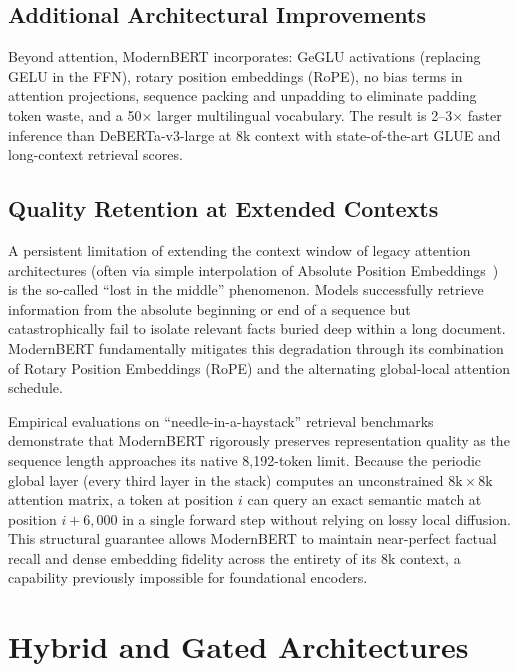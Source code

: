 \documentclass[11pt]{article}
\begin{document}
\subsection{Additional Architectural Improvements}

Beyond attention, ModernBERT incorporates: GeGLU activations (replacing GELU in the FFN), rotary position embeddings (RoPE), no bias terms in attention projections, sequence packing and unpadding to eliminate padding token waste, and a 50$\times$ larger multilingual vocabulary. The result is 2–3$\times$ faster inference than DeBERTa-v3-large at 8k context with state-of-the-art GLUE and long-context retrieval scores.

\subsection{Quality Retention at Extended Contexts}

A persistent limitation of extending the context window of legacy attention architectures (often via simple interpolation of Absolute Position Embeddings~\cite{devlin2018bert}) is the so-called ``lost in the middle'' phenomenon. Models successfully retrieve information from the absolute beginning or end of a sequence but catastrophically fail to isolate relevant facts buried deep within a long document. ModernBERT fundamentally mitigates this degradation through its combination of Rotary Position Embeddings (RoPE) and the alternating global-local attention schedule.

Empirical evaluations on ``needle-in-a-haystack'' retrieval benchmarks demonstrate that ModernBERT rigorously preserves representation quality as the sequence length approaches its native 8,192-token limit. Because the periodic global layer (every third layer in the stack) computes an unconstrained $8\text{k} \times 8\text{k}$ attention matrix, a token at position $i$ can query an exact semantic match at position $i + 6,000$ in a single forward step without relying on lossy local diffusion. This structural guarantee allows ModernBERT to maintain near-perfect factual recall and dense embedding fidelity across the entirety of its 8k context, a capability previously impossible for foundational encoders.

\section{Hybrid and Gated Architectures}
\end{document}

